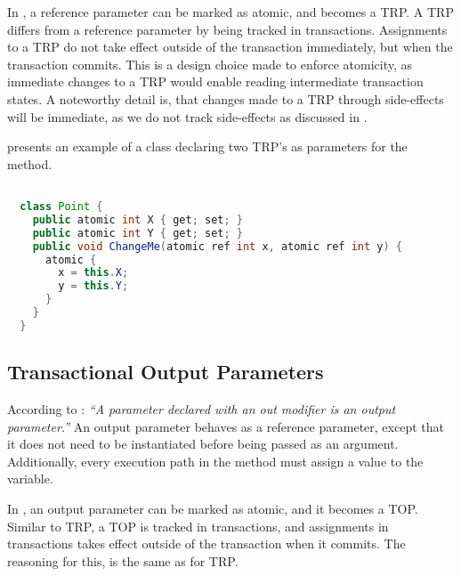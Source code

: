 In \stmnamesp, a reference parameter can be marked as atomic, and becomes a \ac{TRP}. A \ac{TRP} differs from a reference parameter by being tracked in transactions. Assignments to a \ac{TRP} do not take effect outside of the transaction immediately, but when the transaction commits. This is a design choice made to enforce atomicity, as immediate changes to a \ac{TRP} would enable reading intermediate transaction states. A noteworthy detail is, that changes made to a \ac{TRP} through side-effects will be immediate, as we do not track side-effects as discussed in .

 presents an example of a  class declaring two \ac{TRP}'s as parameters for the  method.

\begin{lstlisting}[label=lst:atomic_ref,
  caption={Transactional Reference Parameter},
  language=Java,  
  showspaces=false,
  showtabs=false,
  breaklines=true,
  showstringspaces=false,
  breakatwhitespace=true,
  commentstyle=\color{greencomments},
  keywordstyle=\color{bluekeywords},
  stringstyle=\color{redstrings},
  morekeywords={atomic, retry, orElse, var, get, set}]  % Start your code-block

  class Point {
    public atomic int X { get; set; }
    public atomic int Y { get; set; }
    public void ChangeMe(atomic ref int x, atomic ref int y) {
      atomic { 
        x = this.X;
        y = this.Y;
      }
    }    
  }
\end{lstlisting}

\subsection{Transactional Output Parameters}
According to \cite[p. 97]{csharp2013specificaiton}: \textit{``A parameter declared with an out modifier is an output parameter.''} An output parameter behaves as a reference parameter, except that it does not need to be instantiated before being passed as an argument. Additionally, every execution path in the method must assign a value to the variable\cite[p. 42]{sestoft2011c}. 

In \stmname, an output parameter can be marked as atomic, and it becomes a \ac{TOP}. Similar to \ac{TRP}, a \ac{TOP} is tracked in transactions, and assignments in transactions takes effect outside of the transaction when it commits. The reasoning for this, is the same as for \ac{TRP}.

